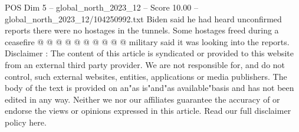 \begin{textsample}{POS Dim 5 – global\_north\_2023\_12 – Score 10.00 – global\_north\_2023\_12/104250992.txt}
Biden said he had heard unconfirmed reports there were no hostages in the tunnels.
Some hostages freed during a ceasefire @ @ @ @ @ @ @ @ @ @ military said it was looking into the reports.
Disclaimer : The content of this article is syndicated or provided to this website from an external third party provider.
We are not responsible for, and do not control, such external websites, entities, applications or media publishers.
The body of the text is provided on an"as is"and"as available"basis and has not been edited in any way.
Neither we nor our affiliates guarantee the accuracy of or endorse the views or opinions expressed in this article.
Read our full disclaimer policy here.

\end{textsample}
